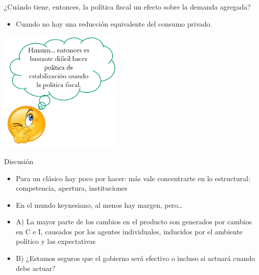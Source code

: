 \documentclass{beamer}
\begin{document}
\begin{frame}{¿Cuándo tiene, entonces, la política fiscal un efecto sobre la demanda agregada?}

    \begin{itemize}
    \item Cuando no hay una reducción equivalente del consumo privado.
    \end{itemize}
     \vspace{3mm}
    
    \centering\includegraphics[width=6cm]{P95b.png}\

\end{frame}

\begin{frame}{Discusión}

    \begin{itemize}
    \item Para un clásico hay poco por hacer: más vale concentrarte en lo estructural: competencia, apertura, instituciones
    \item En el mundo keynesiano, al menos hay margen, pero…
    \item A) La mayor parte de los cambios en el producto son generados por cambios en C e I, causados por los agentes individuales, inducidos por el ambiente político y las expectativas
    \item B) ¿Estamos seguros que el gobierno será efectivo o incluso si actuará cuando debe actuar? 
    \end{itemize}

\end{frame}
\end{document}
